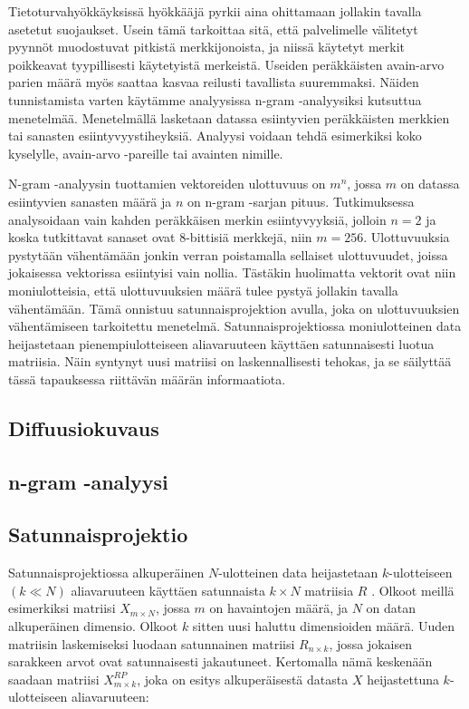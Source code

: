 Tietoturvahyökkäyksissä hyökkääjä pyrkii aina ohittamaan jollakin tavalla asetetut suojaukset. Usein tämä tarkoittaa sitä, että palvelimelle välitetyt pyynnöt muodostuvat pitkistä merkkijonoista, ja niissä käytetyt
merkit poikkeavat tyypillisesti käytetyistä merkeistä. Useiden peräkkäisten avain-arvo parien määrä myös saattaa kasvaa reilusti tavallista suuremmaksi. Näiden tunnistamista varten käytämme analyysissa n-gram -analyysiksi
kutsuttua menetelmää. Menetelmällä lasketaan datassa esiintyvien peräkkäisten merkkien tai sanasten esiintyvyystiheyksiä. Analyysi voidaan tehdä esimerkiksi koko kyselylle, avain-arvo -pareille tai avainten nimille. 

N-gram -analyysin tuottamien vektoreiden ulottuvuus on $m^n$, jossa $m$ on datassa esiintyvien sanasten määrä ja $n$ on n-gram -sarjan pituus. Tutkimuksessa analysoidaan vain kahden peräkkäisen merkin esiintyvyyksiä, jolloin $n=2$ ja koska tutkittavat sanaset ovat 8-bittisiä merkkejä, niin $m=256$. Ulottuvuuksia pystytään vähentämään jonkin verran poistamalla sellaiset ulottuvuudet, joissa jokaisessa vektorissa esiintyisi vain nollia. Tästäkin huolimatta vektorit ovat niin moniulotteisia, että ulottuvuuksien määrä tulee pystyä jollakin tavalla vähentämään. Tämä onnistuu satunnaisprojektion avulla, joka on ulottuvuuksien
vähentämiseen tarkoitettu menetelmä. Satunnaisprojektiossa moniulotteinen data heijastetaan pienempiulotteiseen aliavaruuteen käyttäen satunnaisesti luotua matriisia. Näin syntynyt uusi matriisi on laskennallisesti
tehokas, ja se säilyttää tässä tapauksessa riittävän määrän informaatiota.

\subsection{Diffuusiokuvaus}

\subsection{n-gram -analyysi}



\subsection{Satunnaisprojektio}

Satunnaisprojektiossa alkuperäinen $N$-ulotteinen data heijastetaan $k$-ulotteiseen $(k \ll N)$ aliavaruuteen käyttäen satunnaista $k \times N$ matriisia $R$ \cite{Random}. Olkoot meillä esimerkiksi matriisi 
$X_{m\times N}$, jossa $m$ on havaintojen määrä, ja $N$ on datan alkuperäinen dimensio. Olkoot  $k$  sitten uusi haluttu dimensioiden määrä. Uuden matriisin laskemiseksi luodaan satunnainen matriisi 
$R_{n \times k}$, jossa jokaisen sarakkeen arvot ovat satunnaisesti jakautuneet. Kertomalla nämä keskenään saadaan matriisi $X_{m \times k}^{RP}$, joka on esitys alkuperäisestä datasta $X$ heijastettuna $k$-ulotteiseen 
aliavaruuteen:

